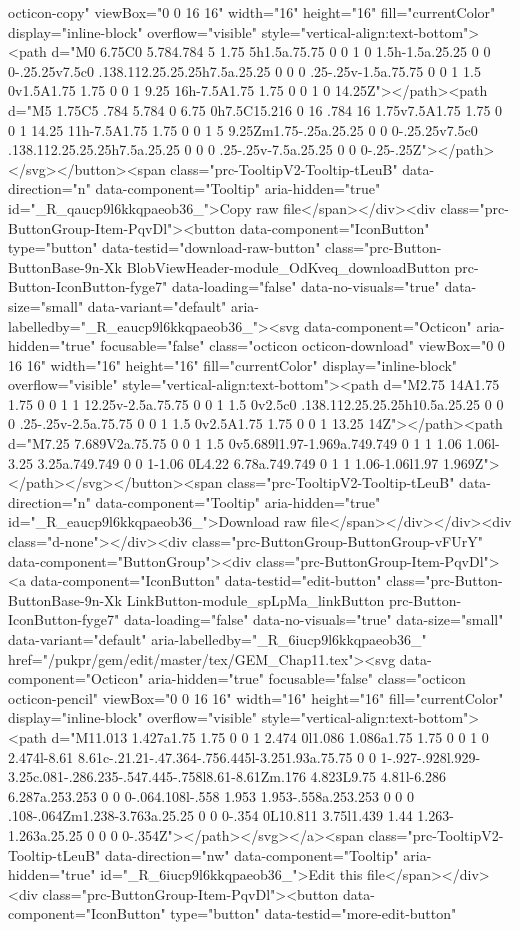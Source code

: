 octicon-copy" viewBox="0 0 16 16" width="16" height="16" fill="currentColor" display="inline-block" overflow="visible" style="vertical-align:text-bottom"><path d="M0 6.75C0 5.784.784 5 1.75 5h1.5a.75.75 0 0 1 0 1.5h-1.5a.25.25 0 0 0-.25.25v7.5c0 .138.112.25.25.25h7.5a.25.25 0 0 0 .25-.25v-1.5a.75.75 0 0 1 1.5 0v1.5A1.75 1.75 0 0 1 9.25 16h-7.5A1.75 1.75 0 0 1 0 14.25Z"></path><path d="M5 1.75C5 .784 5.784 0 6.75 0h7.5C15.216 0 16 .784 16 1.75v7.5A1.75 1.75 0 0 1 14.25 11h-7.5A1.75 1.75 0 0 1 5 9.25Zm1.75-.25a.25.25 0 0 0-.25.25v7.5c0 .138.112.25.25.25h7.5a.25.25 0 0 0 .25-.25v-7.5a.25.25 0 0 0-.25-.25Z"></path></svg></button><span class="prc-TooltipV2-Tooltip-tLeuB" data-direction="n" data-component="Tooltip" aria-hidden="true" id="_R_qaucp9l6kkqpaeob36_">Copy raw file</span></div><div class="prc-ButtonGroup-Item-PqvDl"><button data-component="IconButton" type="button" data-testid="download-raw-button" class="prc-Button-ButtonBase-9n-Xk BlobViewHeader-module_OdKveq_downloadButton prc-Button-IconButton-fyge7" data-loading="false" data-no-visuals="true" data-size="small" data-variant="default" aria-labelledby="_R_eaucp9l6kkqpaeob36_"><svg data-component="Octicon" aria-hidden="true" focusable="false" class="octicon octicon-download" viewBox="0 0 16 16" width="16" height="16" fill="currentColor" display="inline-block" overflow="visible" style="vertical-align:text-bottom"><path d="M2.75 14A1.75 1.75 0 0 1 1 12.25v-2.5a.75.75 0 0 1 1.5 0v2.5c0 .138.112.25.25.25h10.5a.25.25 0 0 0 .25-.25v-2.5a.75.75 0 0 1 1.5 0v2.5A1.75 1.75 0 0 1 13.25 14Z"></path><path d="M7.25 7.689V2a.75.75 0 0 1 1.5 0v5.689l1.97-1.969a.749.749 0 1 1 1.06 1.06l-3.25 3.25a.749.749 0 0 1-1.06 0L4.22 6.78a.749.749 0 1 1 1.06-1.06l1.97 1.969Z"></path></svg></button><span class="prc-TooltipV2-Tooltip-tLeuB" data-direction="n" data-component="Tooltip" aria-hidden="true" id="_R_eaucp9l6kkqpaeob36_">Download raw file</span></div></div><div class="d-none"></div><div class="prc-ButtonGroup-ButtonGroup-vFUrY" data-component="ButtonGroup"><div class="prc-ButtonGroup-Item-PqvDl"><a data-component="IconButton" data-testid="edit-button" class="prc-Button-ButtonBase-9n-Xk LinkButton-module_spLpMa_linkButton prc-Button-IconButton-fyge7" data-loading="false" data-no-visuals="true" data-size="small" data-variant="default" aria-labelledby="_R_6iucp9l6kkqpaeob36_" href="/pukpr/gem/edit/master/tex/GEM_Chap11.tex"><svg data-component="Octicon" aria-hidden="true" focusable="false" class="octicon octicon-pencil" viewBox="0 0 16 16" width="16" height="16" fill="currentColor" display="inline-block" overflow="visible" style="vertical-align:text-bottom"><path d="M11.013 1.427a1.75 1.75 0 0 1 2.474 0l1.086 1.086a1.75 1.75 0 0 1 0 2.474l-8.61 8.61c-.21.21-.47.364-.756.445l-3.251.93a.75.75 0 0 1-.927-.928l.929-3.25c.081-.286.235-.547.445-.758l8.61-8.61Zm.176 4.823L9.75 4.81l-6.286 6.287a.253.253 0 0 0-.064.108l-.558 1.953 1.953-.558a.253.253 0 0 0 .108-.064Zm1.238-3.763a.25.25 0 0 0-.354 0L10.811 3.75l1.439 1.44 1.263-1.263a.25.25 0 0 0 0-.354Z"></path></svg></a><span class="prc-TooltipV2-Tooltip-tLeuB" data-direction="nw" data-component="Tooltip" aria-hidden="true" id="_R_6iucp9l6kkqpaeob36_">Edit this file</span></div><div class="prc-ButtonGroup-Item-PqvDl"><button data-component="IconButton" type="button" data-testid="more-edit-button" 
